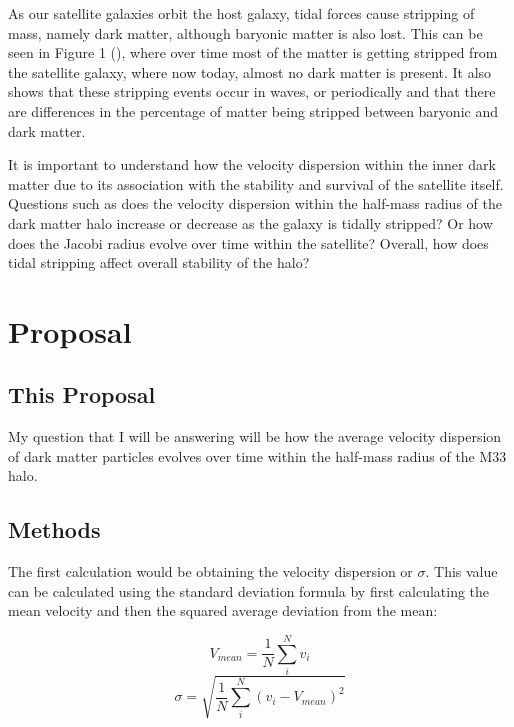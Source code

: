 \documentclass{aastex7}
\begin{document}
\vspace{1 em}
As our satellite galaxies orbit the host galaxy, tidal forces cause stripping of mass, namely dark matter, although baryonic matter is also lost. This can be seen in Figure 1 (\cite{Wang_2022}), where over time most of the matter is getting stripped from the satellite galaxy, where now today, almost no dark matter is present. It also shows that these stripping events occur in waves, or periodically and that there are differences in the percentage of matter being stripped between baryonic and dark matter.

\vspace{1 em}


 It is important to understand how the velocity dispersion within the inner dark matter due to its association with the stability and survival of the satellite itself. Questions such as does the velocity dispersion within the half-mass radius of the dark matter halo increase or decrease as the galaxy is tidally stripped? Or how does the Jacobi radius evolve over time within the satellite? Overall, how does tidal stripping affect overall stability of the halo?

\section{Proposal}

\subsection{This Proposal}
My question that I will be answering will be how the average velocity dispersion of dark matter particles evolves over time within the half-mass radius of the M33 halo.

\subsection{Methods}
The first calculation would be obtaining the velocity dispersion or $\sigma$. This value can be calculated using the standard deviation formula by first calculating the mean velocity and then the squared average deviation from the mean:

\begin{equation}
V_{mean} = \frac{1}{N}\sum_{i}^Nv_i
\end{equation}
\begin{equation}
\sigma = \sqrt{\frac{1}{N}\sum_{i}^N(v_i-V_{mean})^2}
\end{equation}
\end{document}
